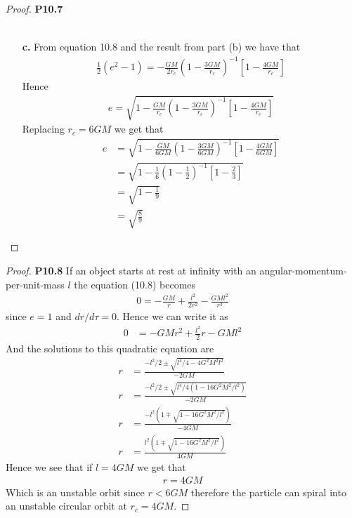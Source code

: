 \documentclass[11pt]{article}
\theoremstyle{definition}
\begin{document}
\begin{proof}{\textbf{P10.7}}
\begin{itemize}
\begin{align*}
    \end{align*}
\cleardoublepage
    \item [\textbf{c.}] From equation 10.8 and the result from part (b) we
    have that
    \begin{align*}
        \frac{1}{2}(e^2 -1 ) = - \frac{GM}{2r_c}\left(1 - \frac{3GM}{r_c}\right)^{-1}
        \left[1 - \frac{4GM}{r_c}\right]
    \end{align*}
    Hence
    \begin{align*}
        e = \sqrt{1 - \frac{GM}{r_c}\left(1 - \frac{3GM}{r_c}\right)^{-1}
        \left[1 - \frac{4GM}{r_c}\right]}
    \end{align*}
    Replacing $r_c = 6GM$ we get that
    \begin{align*}
        e &= \sqrt{1 - \frac{GM}{6GM}\left(1 - \frac{3GM}{6GM}\right)^{-1}
        \left[1 - \frac{4GM}{6GM}\right]}\\
        &= \sqrt{1 - \frac{1}{6}\left(1 - \frac{1}{2}\right)^{-1}
        \left[1 - \frac{2}{3}\right]}\\
        &= \sqrt{1 - \frac{1}{9}}\\
        &= \sqrt{\frac{8}{9}}
    \end{align*}
\end{itemize}
\end{proof}
\begin{proof}{\textbf{P10.8}}
    If an object starts at rest at infinity with an angular-momentum-per-unit-mass
    $l$ the equation (10.8) becomes
    \begin{align*}
        0 = - \frac{GM}{r} + \frac{l^2}{2r^2} - \frac{GMl^2}{r^3}
    \end{align*}
    since $e = 1$ and $dr/d\tau = 0$. Hence we can write it as
    \begin{align*}
        0 &= - GMr^2 + \frac{l^2}{2}r - GMl^2
    \end{align*}
    And the solutions to this quadratic equation are
    \begin{align*}
        r &= \frac{-l^2/2 \pm \sqrt{l^4/4 - 4G^2M^2l^2}}{-2GM}\\
        r &= \frac{-l^2/2 \pm \sqrt{l^4/4(1 - 16G^2M^2/l^2)}}{-2GM}\\
        r &= \frac{-l^2(1 \mp \sqrt{1 - 16G^2M^2/l^2})}{-4GM}\\
        r &= \frac{l^2(1 \mp \sqrt{1 - 16G^2M^2/l^2})}{4GM}
    \end{align*}
    Hence we see that if $l = 4GM$ we get that 
    \begin{align*}
        r = 4GM
    \end{align*}
    Which is an unstable orbit since $r < 6GM$ therefore the particle can
    spiral into an unstable circular orbit at $r_c = 4GM$.
\end{proof}
\end{document}
